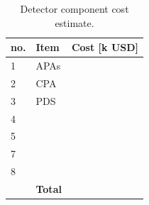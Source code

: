 \begin{table}[h]
\centering
\begin{tabular}{| l| l| c |}
\hline
\textbf{no. } & \textbf{Item}  & \textbf{Cost [k USD]}  \\ \hline
1 & APAs & \\
2 & CPA  & \\
3 &PDS  & \\
4 & & \\
5 & & \\
7 & & \\
8 & & \\ \hline
  & \textbf{Total } & \\ \hline
\end{tabular}
\caption{Detector component cost estimate.}
\label{tab:cost}
\end{table}














